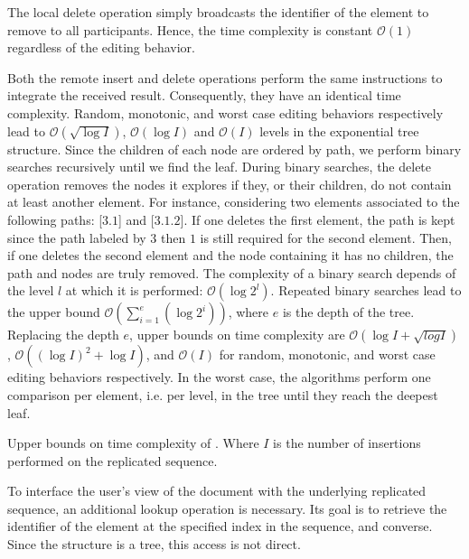 The local delete operation simply broadcasts the identifier of the element to
remove to all participants. Hence, the time complexity is constant
$\mathcal{O}(1)$ regardless of the editing behavior.

Both the remote insert and delete operations perform the same instructions to
integrate the received result. Consequently, they have an identical time
complexity. Random, monotonic, and worst case editing behaviors respectively
lead to $\mathcal{O}(\sqrt{\log I})$, $\mathcal{O}(\log I)$ and $\mathcal{O}(I)$
levels in the exponential tree structure. Since the children of each node are
ordered by path, we perform binary searches recursively until we find the
leaf. During binary searches, the delete operation removes the nodes it explores
if they, or their children, do not contain at least another element. For
instance, considering two elements associated to the following paths: [$3.1$]
and [$3.1.2$]. If one deletes the first element, the path is kept since the path
labeled by $3$ then $1$ is still required for the second element. Then, if one
deletes the second element and the node containing it has no children, the path
and nodes are truly removed. The complexity of a binary search depends of the
level $l$ at which it is performed: $\mathcal{O}(\log 2^l)$. Repeated binary
searches lead to the upper bound
$\mathcal{O}(\textstyle\sum\nolimits_{i=1}^{e}(\log 2^i))$, where $e$ is the
depth of the tree. Replacing the depth $e$, upper bounds on time complexity are
$\mathcal{O}(\log I + \sqrt{log I})$, $\mathcal{O}((\log I)^2+\log I)$, and
$\mathcal{O}(I)$ for random, monotonic, and worst case editing behaviors
respectively. In the worst case, the algorithms perform one comparison per
element, i.e. per level, in the tree until they reach the deepest leaf.


\begin{table}
  \vspace{\ABOVETABLES}
  \caption{\label{table:lseqtime}
    Upper bounds on time complexity of \LSEQ. Where $I$ is the number of 
    insertions performed on the replicated sequence.}
  \centering
  
  \vspace{-\ABOVETABLES}
\end{table}

To interface the user's view of the document with the underlying replicated
sequence, an additional lookup operation is necessary. Its goal is to retrieve
the identifier of the element at the specified index in the sequence, and
converse. Since the structure is a tree, this access is not direct.

